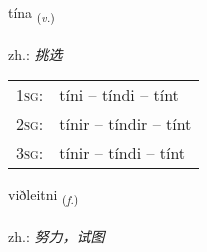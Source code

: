 \documentclass[frontgrid, backgrid]{flacards}\usepackage[]{graphicx}\usepackage[]{xcolor}
\begin{document}
\renewcommand{\flhead}{\vskip5pt \fboxsep=0pt {\small\bfseries\footnotesize Sagnorð | 动词}}
\renewcommand{\fcfoot}{\vskip5pt \fboxsep=0pt \hspace{2pt}{\small\bfseries\footnotesize 3K}}

\renewcommand{\blhead}{\vskip5pt {\small\bfseries\footnotesize Sagnorð | 动词 }}
\renewcommand{\bcfoot}{\vskip5pt \hspace{2pt}{\small\bfseries\footnotesize 3K}}


{tína \small{\textsubscript{(\textit{v.})}} \\[1ex] %
\textphonetic{[tʰiːna]} \\
zh.: \emph{挑选} \\  [2ex]
\renewcommand*{\arraystretch}{0.8}
\begin{tabular}{p{1cm}l}
\textsc{1sg}: & tíni -- tíndi -- tínt \\ 
\textsc{2sg}: & tínir -- tíndir -- tínt \\ 
\textsc{3sg}: & tínir -- tíndi -- tínt \\ 
\end{tabular}
}

\renewcommand{\flhead}{\vskip5pt \fboxsep=0pt {\small\bfseries\footnotesize Nafnorð | 名词}}
\renewcommand{\fcfoot}{\vskip5pt \fboxsep=0pt \hspace{2pt}{\small\bfseries\footnotesize 3K}}

\renewcommand{\blhead}{\vskip5pt {\small\bfseries\footnotesize Nafnorð | 名词 }}
\renewcommand{\bcfoot}{\vskip5pt \hspace{2pt}{\small\bfseries\footnotesize 3K}}


{viðleitni \small{\textsubscript{(\textit{f.})}} \\[1ex] %
\textphonetic{[vɪðleihtnɪ]} \\
zh.: \emph{努力，试图} \\  [2ex]
\renewcommand*{\arraystretch}{0.8}
}
\end{document}
